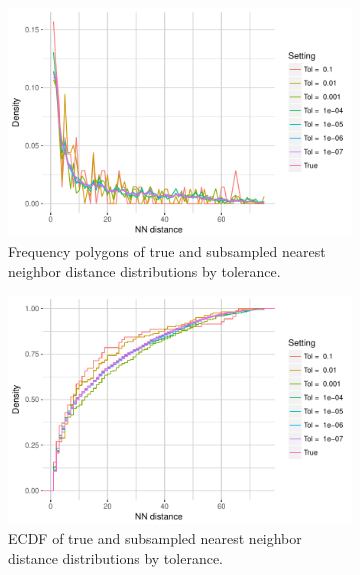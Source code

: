 \documentclass{article}
\begin{document}
\begin{figure}
    \begin{subfigure}{.49\textwidth}
        \includegraphics[width=\linewidth]{Figures/NearestNeighbor/Sequence/freqpoly_by_tol.pdf}
   		\caption{Frequency polygons of true and subsampled nearest neighbor distance distributions by tolerance.}
    	\label{fig:NNFreqPolySequence}
    \end{subfigure}
    \begin{subfigure}{.49\textwidth}
        \includegraphics[width=\linewidth]{Figures/NearestNeighbor/Sequence/ecdf_by_tol.pdf}
    	\caption{ECDF of true and subsampled nearest neighbor distance distributions by tolerance.}
    	\label{fig:NNECDFSequence}
    \end{subfigure}
    \begin{subfigure}[b]{.49\textwidth}

\end{subfigure}
\end{figure}
\end{document}
